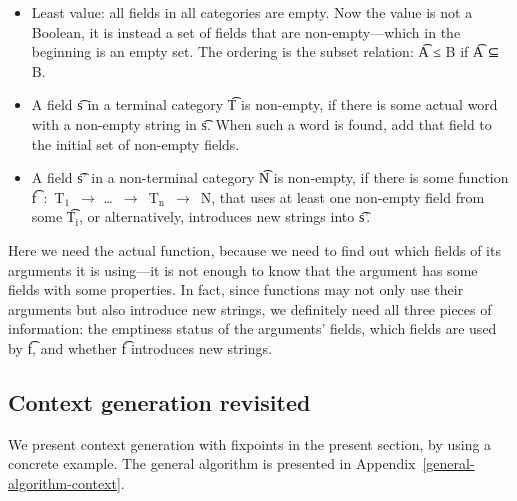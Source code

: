 \begin{itemize}
\setlength\itemsep{0em}
\item Least value: all fields in all categories are empty. Now
  the value is not a Boolean, it is instead a set of fields that are
  non-empty---which in the beginning is an empty set. The ordering
  is the subset relation: \t{A ≤ B} if \t{A ⊆ B}.
\item A field \t{s} in a terminal category \t{T} is non-empty, if
  there is some actual word with a non-empty string in \t{s}. When
  such a word is found, add that field to the initial set of non-empty
  fields.
\item A field \t{s'} in a non-terminal category \t{N} is non-empty, if
  there is some function \t{f~:~T$_\text{1}$~$\rightarrow$
    \dots~$\rightarrow$~T$_\text{n}$~$\rightarrow$~N}, that uses at
  least one non-empty field from some \t{T$_\text{i}$}, or
  alternatively, introduces new strings into \t{s'}.
\end{itemize}

\noindent Here we need the actual \gf{} function, because we need to
find out which fields of its arguments it is using---it is not enough
to know that the argument has some fields with some properties. In
fact, since functions may not only use their arguments but also
introduce new strings, we definitely need all three pieces of
information: the emptiness status of the arguments’ fields, which
fields are used by \t{f}, and whether \t{f} introduces new strings.

\subsection{Context generation revisited}

We present context generation with fixpoints in the present section,
by using a concrete example. The general algorithm is presented in
Appendix~\ref{general-algorithm-context}.


